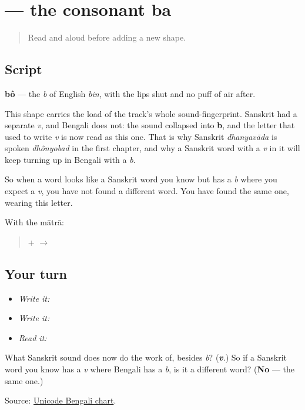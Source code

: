 \section[bô]{ — the consonant ba}

\label{lesson:BN-W03-ba}



\begin{quote}
Read \textbf{} and \textbf{} aloud before adding a new shape.
\end{quote}

\subsection*{Script}
\begin{quote}
\end{quote}

\textbf{bô} — the \emph{b} of English \emph{bin}, with the lips shut and no puff of air after.

This shape carries the load of the track's whole sound-fingerprint. Sanskrit had a separate \emph{v}, and Bengali does not: the sound collapsed into \textbf{b}, and the letter that used to write \emph{v} is now read as this one. That is why Sanskrit \emph{dhanyavāda} is spoken \emph{dhônyobad} in the first chapter, and why a Sanskrit word with a \emph{v} in it will keep turning up in Bengali with a \emph{b}.

So when a word looks like a Sanskrit word you know but has a \emph{b} where you expect a \emph{v}, you have not found a different word. You have found the same one, wearing this letter.

With the mātrā:

\begin{quote}
\textbf{} + \textbf{} $\to$ \textbf{}
\end{quote}

\subsection*{Your turn}
\begin{itemize}
\raggedright
  \item \emph{Write it:} 
  \item \emph{Write it:} 
  \item \emph{Read it:} 
\end{itemize}

\begin{tcolorbox}[breakable,colback=teal!4,colframe=teal!35!black,title={Before you move on}]
What Sanskrit sound does \textbf{} now do the work of, besides \emph{b}? (\emph{\textbf{v}}.) So if a Sanskrit word you know has a \emph{v} where Bengali has a \emph{b}, is it a different word? (\textbf{No} — the same one.)

Source: \href{https://www.unicode.org/charts/PDF/U0980.pdf}{Unicode Bengali chart}.
\end{tcolorbox}

